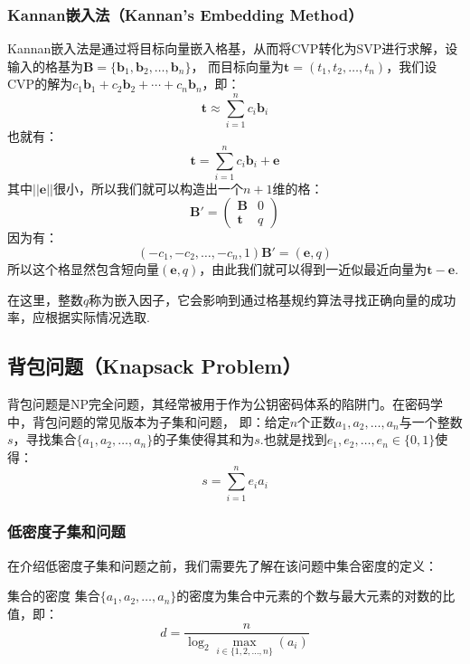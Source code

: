 \documentclass{book}
\numberwithin{equation}{subsubsection}
\begin{document}
\subsubsection*{Kannan嵌入法（Kannan's Embedding Method）}
Kannan嵌入法是通过将目标向量嵌入格基，从而将CVP转化为SVP进行求解，设输入的格基为$\pmb{B}=\{\pmb{b}_1,\pmb{b}_2,\ldots,\pmb{b}_n\}$，
而目标向量为$\pmb{t}=(t_1,t_2,\ldots,t_n)$，我们设CVP的解为$c_1\pmb{b}_1+c_2\pmb{b}_2+\cdots+c_n\pmb{b}_n$，即：
\begin{equation}
    \pmb{t}\approx\sum_{i=1}^{n}c_i\pmb{b}_i
\end{equation}
也就有：
\begin{equation}
    \pmb{t}=\sum_{i=1}^{n}c_i\pmb{b}_i+\pmb{e}
\end{equation}
其中$||\pmb{e}||$很小，所以我们就可以构造出一个$n+1$维的格：
\begin{equation}
    \pmb{B}'=
    \left(\begin{matrix}
    \pmb{B}&0\\
    \pmb{t}&q
    \end{matrix}\right)
\end{equation}
因为有：
\begin{equation}
    (-c_1,-c_2,\ldots,-c_n,1)\pmb{B}'=(\pmb{e},q)
\end{equation}
所以这个格显然包含短向量$(\pmb{e},q)$，由此我们就可以得到一近似最近向量为$\pmb{t}-\pmb{e}$.\par
在这里，整数$q$称为嵌入因子，它会影响到通过格基规约算法寻找正确向量的成功率，应根据实际情况选取.

\subsection{背包问题（Knapsack Problem）}
背包问题是NP完全问题，其经常被用于作为公钥密码体系的陷阱门。在密码学中，背包问题的常见版本为子集和问题，
即：给定$n$个正数$a_1,a_2,\ldots,a_n$与一个整数$s$，寻找集合$\{a_1,a_2,\ldots,a_n\}$的子集使得其和为$s$.也就是找到$e_1,e_2,\ldots,e_n\in\{0,1\}$使得：
\begin{equation}
    s=\sum_{i=1}^{n}e_ia_i
    \nonumber
\end{equation}

\subsubsection{低密度子集和问题\cite{17}}
在介绍低密度子集和问题之前，我们需要先了解在该问题中集合密度的定义：

\begin{concept}{集合的密度}
    集合$\{a_1,a_2,\ldots,a_n\}$的密度为集合中元素的个数与最大元素的对数的比值，即：
    \begin{equation}
        d=\frac{n}{\log_2{\max_{i\in\{1,2,\ldots,n\}}(a_i)}}
        \nonumber
    \end{equation}
\end{concept}
\end{document}
